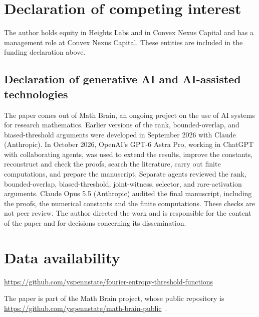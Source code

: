 \documentclass[11pt]{amsart}
\theoremstyle{definition}
\theoremstyle{remark}
\begin{document}
\section*{Declaration of competing interest}
The author holds equity in Heights Labs and in Convex Nexus Capital and
has a management role at Convex Nexus Capital. These entities are included
in the funding declaration above.

\begin{samepage}
\section*{Declaration of generative AI and AI-assisted technologies}
The paper comes out of Math Brain, an ongoing project on the use of AI systems for research mathematics. Earlier versions of the rank, bounded-overlap, and biased-threshold arguments were developed in September 2026 with Claude (Anthropic). In October 2026, OpenAI's GPT-6 Astra Pro, working in ChatGPT with collaborating agents, was used to extend the results, improve the constants, reconstruct and check the proofs, search the literature, carry out finite computations, and prepare the manuscript. Separate agents reviewed the rank, bounded-overlap, biased-threshold, joint-witness, selector, and rare-activation arguments. Claude Opus 5.5 (Anthropic) audited the final manuscript, including the proofs, the numerical constants and the finite computations. These checks are not peer review. The author directed the work and is responsible for the content of the paper and for decisions concerning its dissemination.
\par
\end{samepage}

\section*{Data availability}
\url{https://github.com/yspennstate/fourier-entropy-threshold-functions}

The paper is part of the Math Brain project, whose public repository is \url{https://github.com/yspennstate/math-brain-public}~\cite{MathBrainRepo}.
\end{document}
